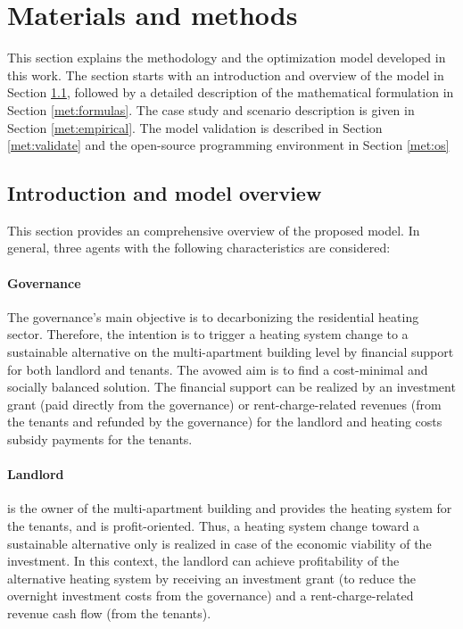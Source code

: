 \section{Materials and methods}\label{methodology}
This section explains the methodology and the optimization model developed in this work. The section starts with an introduction and overview of the model in Section \ref{met:intro}, followed by a detailed description of the mathematical formulation in Section \ref{met:formulas}. The case study and scenario description is given in Section \ref{met:empirical}. The model validation is described in Section \ref{met:validate} and the open-source programming environment in Section \ref{met:os}

\subsection{Introduction and model overview}\label{met:intro}
This section provides an comprehensive overview of the proposed model. In general, three agents with the following characteristics are considered:
\paragraph{Governance} The governance's main objective is to decarbonizing the residential heating sector. Therefore, the intention is to trigger a heating system change to a sustainable alternative on the multi-apartment building level by financial support for both landlord and tenants. The avowed aim is to find a cost-minimal and socially balanced solution. The financial support can be realized by an investment grant (paid directly from the governance) or rent-charge-related revenues (from the tenants and refunded by the governance) for the landlord and heating costs subsidy payments for the tenants. 
\paragraph{Landlord} is the owner of the multi-apartment building and provides the heating system for the tenants, and is profit-oriented. Thus, a heating system change toward a sustainable alternative only is realized in case of the economic viability of the investment. In this context, the landlord can achieve profitability of the alternative heating system by receiving an investment grant (to reduce the overnight investment costs from the governance) and a rent-charge-related revenue cash flow (from the tenants). 
